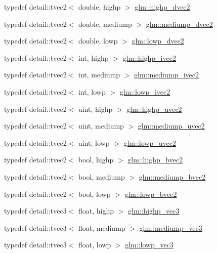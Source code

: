 \begin{CompactItemize}
typedef detail::tvec2$<$ double, highp $>$ \hyperlink{group__core__precision_gcfbe8512142fff27f0bfb44958c1752f}{glm::highp\_\-dvec2}
\item 
typedef detail::tvec2$<$ double, mediump $>$ \hyperlink{group__core__precision_gce1f1cc2eb8e978dcb60e682af87b541}{glm::mediump\_\-dvec2}
\item 
typedef detail::tvec2$<$ double, lowp $>$ \hyperlink{group__core__precision_g27a115a27d5f065e8c043f57191d583b}{glm::lowp\_\-dvec2}
\item 
typedef detail::tvec2$<$ int, highp $>$ \hyperlink{group__core__precision_gb2bac6095f51f7d7f74747afc2f6747a}{glm::highp\_\-ivec2}
\item 
typedef detail::tvec2$<$ int, mediump $>$ \hyperlink{group__core__precision_g4f1bf9844e667805235823afe809aa73}{glm::mediump\_\-ivec2}
\item 
typedef detail::tvec2$<$ int, lowp $>$ \hyperlink{group__core__precision_g562c5c67d6431ab88fc4a032239e2137}{glm::lowp\_\-ivec2}
\item 
typedef detail::tvec2$<$ uint, highp $>$ \hyperlink{group__core__precision_gaf92be4c1fca33cff90c1ed15b521c79}{glm::highp\_\-uvec2}
\item 
typedef detail::tvec2$<$ uint, mediump $>$ \hyperlink{group__core__precision_g15c8fb77bdb6763ef73b39e02eb98a56}{glm::mediump\_\-uvec2}
\item 
typedef detail::tvec2$<$ uint, lowp $>$ \hyperlink{group__core__precision_g06c64bb528bbecf276ab2d4a2b6c934e}{glm::lowp\_\-uvec2}
\item 
typedef detail::tvec2$<$ bool, highp $>$ \hyperlink{group__core__precision_g4153415d1f3d390219ac9464652ac377}{glm::highp\_\-bvec2}
\item 
typedef detail::tvec2$<$ bool, mediump $>$ \hyperlink{group__core__precision_g1406d96eb96694d91052d3f882658ab2}{glm::mediump\_\-bvec2}
\item 
typedef detail::tvec2$<$ bool, lowp $>$ \hyperlink{group__core__precision_g8ff6222d4bb4245106dab0727c8e8a45}{glm::lowp\_\-bvec2}
\item 
typedef detail::tvec3$<$ float, highp $>$ \hyperlink{group__core__precision_g4879124da7a18d6b681d933cb8c4267d}{glm::highp\_\-vec3}
\item 
typedef detail::tvec3$<$ float, mediump $>$ \hyperlink{group__core__precision_g10acc767a046b85205f52ce7f834626f}{glm::mediump\_\-vec3}
\item 
typedef detail::tvec3$<$ float, lowp $>$ \hyperlink{group__core__precision_g062795097526e2758d34cb38387dd82d}{glm::lowp\_\-vec3}

\end{CompactItemize}
